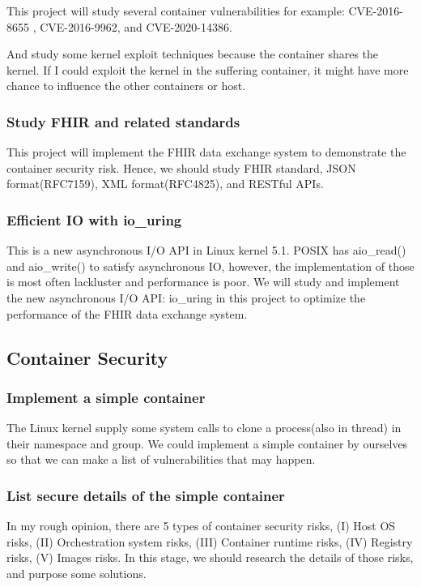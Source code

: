 \documentclass[12pt,a4paper]{IEEEconf}
\begin{document}
This project will study several container vulnerabilities for example: CVE-2016-8655
\cite{CVE-2016-8655}, CVE-2016-9962\cite{CVE-2016-9962}, and CVE-2020-14386\cite{CVE-2020-14386}.

And study some kernel exploit techniques\cite{Kernel_exploitation} because the container shares
the kernel. If I could exploit the kernel in the suffering container, it might have more chance
to influence the other containers or host.

\subsubsection{Study FHIR and related standards}
This project will implement the FHIR\cite{FHIR_home} data exchange system to demonstrate the container
security risk. Hence, we should study FHIR standard, JSON format(RFC7159), XML format(RFC4825), and
RESTful APIs.

\subsubsection{Efficient IO with io\_uring}\cite{Efficient_IO_uring}
This is a new asynchronous I/O API in Linux kernel 5.1. POSIX has aio\_read() and aio\_write() to
satisfy asynchronous IO, however, the implementation of those is most often lackluster and performance
is poor. We will study and implement the new asynchronous I/O API: io\_uring in this project to
optimize the performance of the FHIR data exchange system.

\subsection{Container Security}
\subsubsection{Implement a simple container}
The Linux kernel supply some system calls to clone a process(also in thread) in their namespace
and group. We could implement a simple container by ourselves so that we can make a list of
vulnerabilities that may happen.
\UseRawInputEncoding

\subsubsection{List secure details of the simple container}
In my rough opinion, there are 5 types of container security risks, (\RN{1}) Host OS risks, (\RN{2})
Orchestration system risks, (\RN{3}) Container runtime risks, (\RN{4}) Registry risks, (\RN{5})
Images risks. In this stage, we should research the details of those risks, and purpose some solutions.
\end{document}
